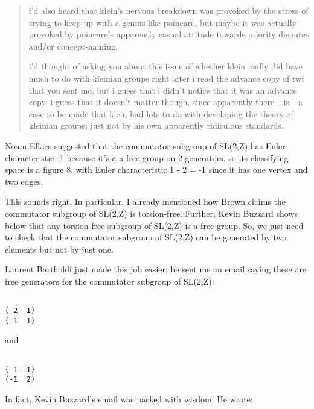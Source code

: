 \begin{quote}
 i'd also heard that klein's nervous breakdown was provoked by the
 stress of trying to keep up with a genius like poincare, but maybe it
 was actually provoked by poincare's apparently casual attitude towards
 priority disputes and/or concept-naming.

 i'd thought of asking you about this issue of whether klein really did
 have much to do with kleinian groups right after i read the advance
 copy of twf that you sent me, but i guess that i didn't notice that it
 was an advance copy.  i guess that it doesn't matter though, since
 apparently there _is_ a case to be made that klein had lots to do with
 developing the theory of kleinian groups; just not by his own
 apparently ridiculous standards.
\end{quote}

Noam Elkies suggested that the commutator subgroup of SL(2,Z)
has Euler characteristic -1 because it's a a free group on 2
generators, so its classifying space is a figure 8, with Euler
characteristic 1 - 2 = -1 since it has one vertex and two edges.

This sounds right.  In particular, I already mentioned how Brown
claims the commutator subgroup of SL(2,Z) is torsion-free.  Further,
Kevin Buzzard shows below that any torsion-free subgroup of SL(2,Z)
is a free group.  So, we just need to check that the commutator
subgroup of SL(2,Z) can be generated by two elements but not by just one.

Laurent Bartholdi just made this job easier;
he sent me an email saying these are free generators
for the commutator subgroup of SL(2,Z):


\begin{verbatim}

( 2 -1)
(-1  1)
\end{verbatim}
    

and


\begin{verbatim}

( 1 -1)
(-1  2)
\end{verbatim}
    

In fact, Kevin Buzzard's email was packed with wisdom.  He wrote:

